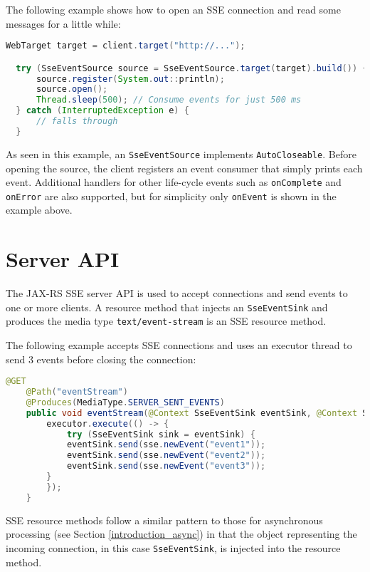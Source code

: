 The following example shows how to open an SSE connection and read some messages for a little while:

\begin{lstlisting}[language=Java]
  WebTarget target = client.target("http://...");

  try (SseEventSource source = SseEventSource.target(target).build()) {
      source.register(System.out::println);
      source.open();  
      Thread.sleep(500); // Consume events for just 500 ms 
  } catch (InterruptedException e) { 
      // falls through 
  }
\end{lstlisting}

As seen in this example, an \lstinline{SseEventSource} implements \lstinline{AutoCloseable}. Before opening the source,
the client registers an event consumer that simply prints each event. Additional handlers for other life-cycle events
such as \lstinline{onComplete} and \lstinline{onError} are also supported, but for simplicity only \lstinline{onEvent}
is shown in the example above.

\section{Server API}
\label{sse_server_api}

The JAX-RS SSE server API is used to accept connections and send events to one or more clients. A resource method that
injects an \lstinline{SseEventSink} and produces the media type \lstinline{text/event-stream} is an SSE resource method.

The following example accepts SSE connections and uses an executor thread to send 3 events before closing the
connection:

\begin{lstlisting}[language=Java]
    @GET 
    @Path("eventStream") 
    @Produces(MediaType.SERVER_SENT_EVENTS) 
    public void eventStream(@Context SseEventSink eventSink, @Context Sse sse) {
        executor.execute(() -> {
            try (SseEventSink sink = eventSink) {  
            eventSink.send(sse.newEvent("event1"));
            eventSink.send(sse.newEvent("event2"));
            eventSink.send(sse.newEvent("event3"));
        }
        });
    }
\end{lstlisting}

SSE resource methods follow a similar pattern to those for asynchronous processing
(see Section \ref{introduction_async}) in that the object representing the incoming connection, in this case
\lstinline{SseEventSink}, is injected into the resource method.

